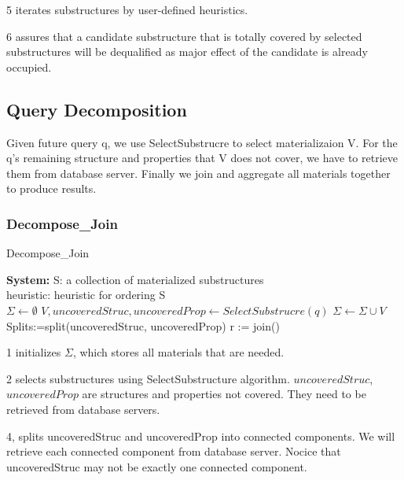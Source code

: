 5 iterates substructures by user-defined heuristics. 

6 assures that a candidate substructure that is totally covered by selected substructures will be dequalified as major effect of the candidate is already occupied. 

\subsection{Query Decomposition}

Given future query q, we use SelectSubstrucre to select materializaion V. For the q's remaining structure and properties that V does not cover, we have to retrieve them from database server. Finally we join and aggregate all materials together to produce results.

\subsubsection{Decompose\_Join}

\begin{algorithm}[H]
	\caption{Decompose\_Join}
	\LinesNumbered
	\textbf{System:} S: a collection of materialized substructures\\ heuristic: heuristic for ordering S\\
	$\Sigma \gets \emptyset $\;
	$V, uncoveredStruc, uncoveredProp \gets SelectSubstrucre(q) $\;
	$\Sigma \gets \Sigma \cup V $\;
	Splits:=split(uncoveredStruc, uncoveredProp)\;
	r := join(\Sigma)\;
\end{algorithm}

1 initializes $\Sigma$, which stores all materials that are needed.

2 selects substructures using SelectSubstructure algorithm. $uncoveredStruc$, $uncoveredProp$ are structures and properties not covered. They need to be retrieved from database servers.

4, splits uncoveredStruc and uncoveredProp into connected components. We will retrieve each connected component from database server. Nocice that uncoveredStruc may not be exactly one connected component.


